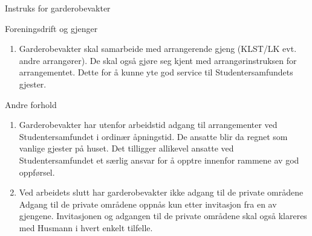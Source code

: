 \begin{instruks*}{Instruks for garderobevakter}
    \begin{instruksledd}{Foreningsdrift og gjenger}
        \begin{enumerate}
            \item Garderobevakter skal samarbeide med arrangerende gjeng (KLST/LK evt. andre arrangører). De skal også gjøre seg
                kjent med arrangørinstruksen for arrangementet. Dette for å kunne yte god service til Studentersamfundets gjester.
        \end{enumerate}
    \end{instruksledd}

    \begin{instruksledd}{Andre forhold}
        \begin{enumerate}
            \item Garderobevakter har utenfor arbeidstid adgang til arrangementer ved Studentersamfundet i ordinær åpningstid. De
                ansatte blir da regnet som vanlige gjester på huset. Det tilligger allikevel ansatte ved Studentersamfundet et særlig
                ansvar for å opptre innenfor rammene av god oppførsel.
            \item Ved arbeidets slutt har garderobevakter ikke adgang til de private områdene Adgang til de private områdene oppnås
                kun etter invitasjon fra en av gjengene. Invitasjonen og adgangen til de private områdene skal også klareres med
                Husmann i hvert enkelt tilfelle.
        \end{enumerate}
    \end{instruksledd}

\end{instruks*}

